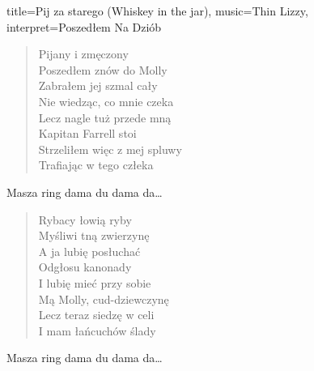 \begin{song}{title={Pij za starego (Whiskey in the jar)}, music={Thin Lizzy}, interpret={Poszedłem Na Dziób}}
\begin{multicols}{2}
\begin{interlude}
           
    \end{interlude}
    \begin{verse}
        Pijany i zmęczony \\
        Poszedłem znów do Molly \\
        Zabrałem jej szmal cały \\
        Nie wiedząc, co mnie czeka \\
        Lecz nagle tuż przede mną \\
        Kapitan Farrell stoi \\
        Strzeliłem więc z mej spluwy \\
        Trafiając w tego człeka
    \end{verse}
    \begin{chorus}
        Masza ring dama du dama da\ldots
    \end{chorus}
    \begin{interlude}
           
    \end{interlude}
    \begin{verse}
        Rybacy łowią ryby \\
        Myśliwi tną zwierzynę \\
        A ja lubię posłuchać \\
        Odgłosu kanonady \\
        I lubię mieć przy sobie \\
        Mą Molly, cud-dziewczynę \\
        Lecz teraz siedzę w celi \\
        I mam łańcuchów ślady
    \end{verse}
    \begin{chorus}
        Masza ring dama du dama da\ldots
    \end{chorus}
    \begin{interlude}
           
    \end{interlude}
    \end{multicols}
\end{song}


